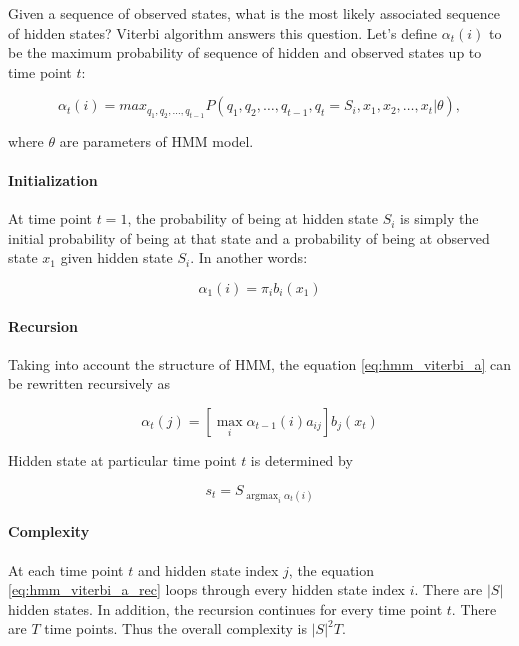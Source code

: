 \documentclass[thesis=B,english]{FITthesis}[2012/06/26]
\DeclareMathOperator*{\argmax}{argmax} %
\begin{document}
Given a sequence of observed states, what is the most likely associated sequence of hidden states? Viterbi algorithm answers this question. Let's define $\alpha_t(i)$ to be the maximum probability of sequence of hidden and observed states up to time point $t$:

\begin{equation} \label{eq:hmm_viterbi_a}
\alpha_t(i) = max_{q_1,q_2,\dots,q_{t-1}} P(q_1,q_2,\dots,q_{t-1},q_t = S_i,x_1,x_2,\dots,x_t | \theta),
\end{equation}

where $\theta$ are parameters of HMM model.

\paragraph{Initialization}

At time point $t=1$, the probability of being at hidden state $S_i$ is simply the initial probability of being at that state and a probability of being at observed state $x_1$ given hidden state $S_i$. In another words:

\begin{equation}
\alpha_1(i) = \pi_i b_i(x_1)
\end{equation}

\paragraph{Recursion}
Taking into account the structure of HMM, the equation \ref{eq:hmm_viterbi_a} can be rewritten recursively as

\begin{equation} \label{eq:hmm_viterbi_a_rec}
\alpha_t(j) = [\max_i \alpha_{t-1}(i)a_{ij}] b_j(x_t)
\end{equation}

Hidden state at particular time point $t$ is determined by

\begin{equation}
s_t = S_{\argmax_i \alpha_{t}(i)}
\end{equation}

\paragraph{Complexity}

At each time point $t$ and hidden state index $j$, the equation \ref{eq:hmm_viterbi_a_rec} loops through every hidden state index $i$. There are $\vert{S}\vert$ hidden states. In addition, the recursion continues for every time point $t$. There are $T$ time points. Thus the overall complexity is
${\vert{S}\vert}^2 T$.
\end{document}
